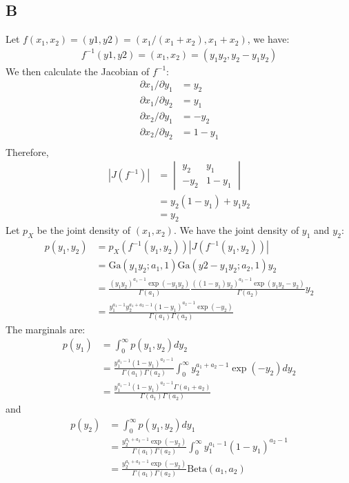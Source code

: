 \documentclass{article}
\begin{document}
\subsection*{B}
Let \(f(x_1, x_2) = (y1, y2) = (x_1/(x_1+x_2), x_1+x_2) \), we have:
\begin{align*}
f^{-1}(y1, y2) = (x_1, x_2) = (y_1y_2, y_2 - y_1y_2)
\end{align*}
We then calculate the Jacobian of \(f^{-1}\):
\begin{align*}
\partial x_1 / \partial y_1 &= y_2 \\
\partial x_1 / \partial y_2 &= y_1 \\
\partial x_2 / \partial y_1 &= -y_2 \\
\partial x_2 / \partial y_2 &= 1-y_1\\
\end{align*}
Therefore,
\begin{align*}
|J(f^{-1})| &= \begin{vmatrix}
y_2 & y_1 \\
-y_2 & 1 - y_1
\end{vmatrix} \\
&= y_2(1-y_1) + y_1y_2\\
&= y_2
\end{align*}
Let \(p_X\) be the joint density of \((x_1, x_2)\). We have the joint density of \(y_1\) and \(y_2\):
\begin{align*}
p(y_1, y_2) &= p_X(f^{-1}(y_1,y_2)) |J(f^{-1}(y_1, y_2))| \\
&=\mathrm{Ga}(y_1y_2; a_1, 1) \mathrm{Ga}(y2 - y_1y_2; a_2, 1) y_2\\
&= \frac{(y_1y_2)^{a_1-1} \exp(-y_1y_2)}{\Gamma(a_1)}
\frac{((1-y_1)y_2)^{a_2-1} \exp(y_1y_2-y_2)}{\Gamma(a_2)} y_2\\
&= \frac{y_1^{a_1-1}y_2^{a_1+a_2-1}(1-y_1)^{a_2-1}\exp(-y_2)}{\Gamma(a_1)\Gamma(a_2)}
\end{align*}
The marginals are:
\begin{align*}
p(y_1) &= \int_{0}^{\infty} p(y_1, y_2) dy_2\\
&= \frac{y_1^{a_1-1}(1-y_1)^{a_2-1}}{\Gamma(a_1)\Gamma(a_2)} \int_{0}^{\infty}y_2^{a_1+a_2-1}\exp(-y_2) dy_2\\
&=\frac{y_1^{a_1-1}(1-y_1)^{a_2-1}\Gamma
(a_1+a_2)}{\Gamma(a_1)\Gamma(a_2)}
\end{align*}
and 
\begin{align*}
p(y_2) &= \int_{0}^{\infty} p(y_1, y_2) dy_1\\
&=\frac{y_2^{a_1+a_2-1}\exp(-y_2)}{\Gamma(a_1)\Gamma(a_2)}\int_{0}^{\infty}y_1^{a_1-1}(1-y_1)^{a_2-1}\\
&= \frac{y_2^{a_1+a_2-1}\exp(-y_2)}{\Gamma(a_1)\Gamma(a_2)} \mathrm{Beta}(a_1, a_2)
\end{align*}
\end{document}
